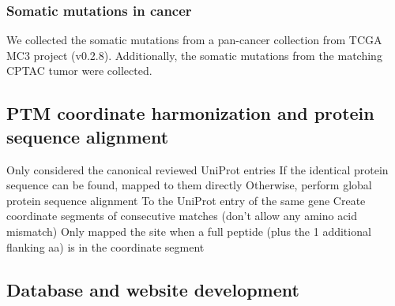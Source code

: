 \subsubsection{Somatic mutations in cancer}
We collected the somatic mutations from a pan-cancer collection from TCGA MC3 project \cite{ellrottk_tcga:MC3MutationCalling2018} (v0.2.8). Additionally, the somatic mutations from the matching CPTAC tumor were collected.


\subsection{PTM coordinate harmonization and protein sequence alignment}
Only considered the canonical reviewed UniProt entries
If the identical protein sequence can be found, mapped to them directly
Otherwise, perform global protein sequence alignment
To the UniProt entry of the same gene
Create coordinate segments of consecutive matches (don't allow any amino acid mismatch)
Only mapped the site when a full peptide (plus the 1 additional flanking aa) is in the coordinate segment


\subsection{Database and website development}

